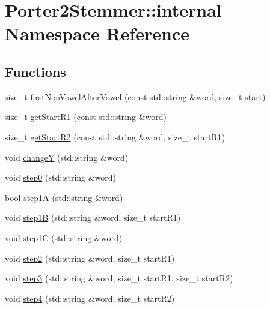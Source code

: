 \hypertarget{namespace_porter2_stemmer_1_1internal}{}\section{Porter2\+Stemmer\+:\+:internal Namespace Reference}
\label{namespace_porter2_stemmer_1_1internal}
\subsection*{Functions}
\begin{DoxyCompactItemize}
\item 
size\+\_\+t \hyperlink{namespace_porter2_stemmer_1_1internal_a4419080bc3b64aca4998a732e9f99d84}{first\+Non\+Vowel\+After\+Vowel} (const std\+::string \&word, size\+\_\+t start)
\item 
size\+\_\+t \hyperlink{namespace_porter2_stemmer_1_1internal_a2d7e133e04950f30c9b3a2935be7c802}{get\+Start\+R1} (const std\+::string \&word)
\item 
size\+\_\+t \hyperlink{namespace_porter2_stemmer_1_1internal_a87bb0a5733b6267185b7951349477070}{get\+Start\+R2} (const std\+::string \&word, size\+\_\+t start\+R1)
\item 
void \hyperlink{namespace_porter2_stemmer_1_1internal_add0f2aec57b66845cb78e98844bb4205}{change\+Y} (std\+::string \&word)
\item 
void \hyperlink{namespace_porter2_stemmer_1_1internal_ae689551ae90968445d4ab1a60ffc805c}{step0} (std\+::string \&word)
\item 
bool \hyperlink{namespace_porter2_stemmer_1_1internal_af0acc908e606cd6e2917bf2ed31d5fe7}{step1\+A} (std\+::string \&word)
\item 
void \hyperlink{namespace_porter2_stemmer_1_1internal_af4cffda4b443475c766407d60eac03dc}{step1\+B} (std\+::string \&word, size\+\_\+t start\+R1)
\item 
void \hyperlink{namespace_porter2_stemmer_1_1internal_abc52eb93a0acc99087ca62bb2a4e647e}{step1\+C} (std\+::string \&word)
\item 
void \hyperlink{namespace_porter2_stemmer_1_1internal_a8bde57d3eeee683082f53cd7a9a0a2f8}{step2} (std\+::string \&word, size\+\_\+t start\+R1)
\item 
void \hyperlink{namespace_porter2_stemmer_1_1internal_a8ea5872c398ea38fb5ff359879613a4e}{step3} (std\+::string \&word, size\+\_\+t start\+R1, size\+\_\+t start\+R2)
\item 
void \hyperlink{namespace_porter2_stemmer_1_1internal_a46c7932444166421508feab27b1addfa}{step4} (std\+::string \&word, size\+\_\+t start\+R2)

\end{DoxyCompactItemize}
